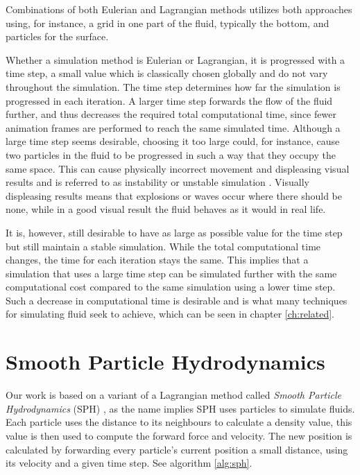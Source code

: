 \documentclass[../../main.tex]{subfiles}
\begin{document}
Combinations of both Eulerian and Lagrangian methods utilizes both approaches using, for instance, a grid in one part of the fluid, typically the bottom, and particles for the surface.

Whether a simulation method is Eulerian or Lagrangian, it is progressed with a time step, a small value which is classically chosen globally and do not vary throughout the simulation. The time step determines how far the simulation is progressed in each iteration. A larger time step forwards the flow of the fluid further, and thus decreases the required total computational time, since fewer animation frames are performed to reach the same simulated time. Although a large time step seems desirable, choosing it too large could, for instance, cause two particles in the fluid to be progressed in such a way that they occupy the same space. This can cause physically incorrect movement and displeasing visual results and is referred to as instability or unstable simulation \citep{ihmsen2014sph}. Visually displeasing results means that explosions or waves occur where there should be none, while in a good visual result the fluid behaves as it would in real life. 

It is, however, still desirable to have as large as possible value for the time step but still maintain a stable simulation. While the total computational time changes, the time for each iteration stays the same. This implies that a simulation that uses a large time step can be simulated further with the same computational cost compared to the same simulation using a lower time step. Such a decrease in computational time is desirable and is what many techniques for simulating fluid seek to achieve, which can be seen in chapter \ref{ch:related}. 


\section{Smooth Particle Hydrodynamics}
Our work is based on a variant of a Lagrangian method called \textit{Smooth Particle Hydrodynamics} (SPH) \citep{lucy1977numerical, gingold1977smoothed}, as the name implies SPH uses particles to simulate fluids. Each particle uses the distance to its neighbours to calculate a density value, this value is then used to compute the forward force and velocity. The new position is calculated by forwarding every particle's current position a small distance, using its velocity and a given time step. See algorithm \ref{alg:sph}. 
\end{document}
